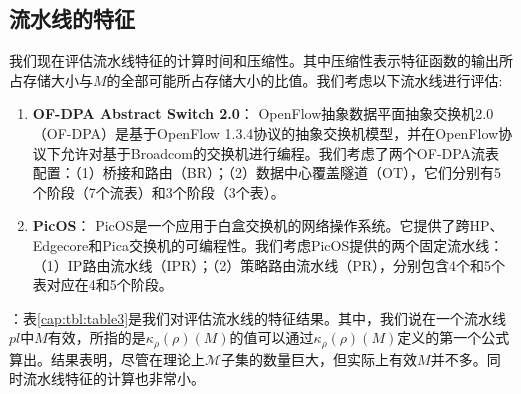 \documentclass{ctexart}
\newcommand{\exampledp}{\texttt{ExampleDP}}
\newcommand{\para}[1]{\smallskip\noindent {\bf #1}}
\begin{document}
\subsection{流水线的特征}

我们现在评估流水线特征的计算时间和压缩性。其中压缩性表示特征函数的输出所占存储大小与$M$的全部可能所占存储大小的比值。我们考虑以下流水线进行评估:


\begin{enumerate}
  \item \textbf{OF-DPA Abstract Switch 2.0}： OpenFlow抽象数据平面抽象交换机2.0（OF-DPA）是基于OpenFlow 1.3.4协议的抽象交换机模型，并在OpenFlow协议下允许对基于Broadcom的交换机进行编程。我们考虑了两个OF-DPA流表配置：（1）桥接和路由（BR）；（2）数据中心覆盖隧道（OT），它们分别有5个阶段（7个流表）和3个阶段（3个表）。\cite{OF-DPA}

  \item \textbf{PicOS}： PicOS是一个应用于白盒交换机的网络操作系统。它提供了跨HP、Edgecore和Pica交换机的可编程性。我们考虑PicOS提供的两个固定流水线：（1）IP路由流水线（IPR）；（2）策略路由流水线（PR），分别包含4个和5个表对应在4和5个阶段。\cite{PicOS}
\end{enumerate}

\para{结果}：表\ref{cap:tbl:table3}是我们对评估流水线的特征结果。其中，我们说在一个流水线$pl$中$M$有效，所指的是$\kappa_\rho(\rho)(M)$的值可以通过$\kappa_\rho(\rho)(M)$定义的第一个公式算出。结果表明，尽管在理论上$\mathcal{M}$子集的数量巨大，但实际上有效$M$并不多。同时流水线特征的计算也非常小。


\end{document}
